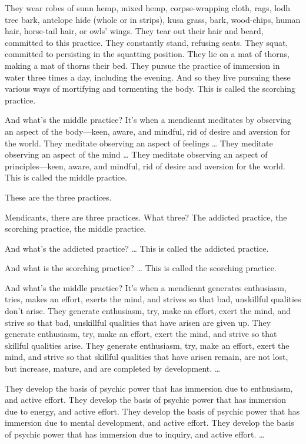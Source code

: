 \documentclass[12pt,openany]{book}%
\begin{document}
They wear robes of sunn hemp, mixed hemp, corpse-wrapping cloth, rags, lodh tree bark, antelope hide (whole or in strips), kusa grass, bark, wood-chips, human hair, horse-tail hair, or owls’ wings. They tear out their hair and beard, committed to this practice. They constantly stand, refusing seats. They squat, committed to persisting in the squatting position. They lie on a mat of thorns, making a mat of thorns their bed. They pursue the practice of immersion in water three times a day, including the evening. And so they live pursuing these various ways of mortifying and tormenting the body. This is called the scorching practice. 

And what’s the middle practice? It’s when a mendicant meditates by observing an aspect of the body—keen, aware, and mindful, rid of desire and aversion for the world. They meditate observing an aspect of feelings … They meditate observing an aspect of the mind … They meditate observing an aspect of principles—keen, aware, and mindful, rid of desire and aversion for the world. This is called the middle practice. 

These are the three practices. 

Mendicants, there are three practices. What three? The addicted practice, the scorching practice, the middle practice. 

And what’s the addicted practice? … This is called the addicted practice. 

And what is the scorching practice? … This is called the scorching practice. 

And what’s the middle practice? It’s when a mendicant generates enthusiasm, tries, makes an effort, exerts the mind, and strives so that bad, unskillful qualities don’t arise. They generate enthusiasm, try, make an effort, exert the mind, and strive so that bad, unskillful qualities that have arisen are given up. They generate enthusiasm, try, make an effort, exert the mind, and strive so that skillful qualities arise. They generate enthusiasm, try, make an effort, exert the mind, and strive so that skillful qualities that have arisen remain, are not lost, but increase, mature, and are completed by development. … 

They develop the basis of psychic power that has immersion due to enthusiasm, and active effort. They develop the basis of psychic power that has immersion due to energy, and active effort. They develop the basis of psychic power that has immersion due to mental development, and active effort. They develop the basis of psychic power that has immersion due to inquiry, and active effort. … 
\end{document}
